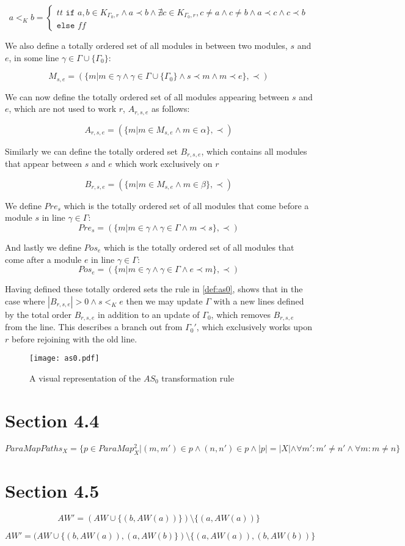\[a <_K b = \left\{\begin{matrix}
tt \texttt{ if } a,b \in K_{\Gamma_0 ,r} \land a \prec b \land \nexists c \in K_{\Gamma_0 ,r}, c \neq a \land c \neq b \land a \prec c \land c \prec b \\ \texttt{else } ff
\end{matrix}\right.\]

We also define a totally ordered set of all modules in between two modules, $s$ and $e$, in some line $\gamma \in \Gamma \cup \{\Gamma_0\} $:

\[M_{s,e} = (\{m | m \in \gamma \land \gamma \in \Gamma \cup \{\Gamma_0\} \land s \prec m \land m \prec e\}, \prec)\]

We can now define the totally ordered set of all modules appearing between $s$ and $e$, which are not used to work $r$, $A_{r,s,e}$ as follows: 

\[A_{r,s,e} = (\{m |m \in M_{s,e} \land m \in \alpha\}, \prec)\]

Similarly we can define the totally ordered set $B_{r,s,e}$, which contains all modules that appear between $s$ and $e$ which work exclusively on $r$

\[B_{r,s,e} = (\{m |m \in M_{s,e} \land m \in \beta\}, \prec)\]

We define $Pre_{s}$ which is the totally ordered set of all modules that come before a module $s$ in line $\gamma \in \Gamma$:
\[Pre_{s} = (\{m | m \in \gamma \land \gamma \in \Gamma \land m \prec s\}, \prec)\]

And lastly we define $Pos_{e}$ which is the totally ordered set of all modules that come after a module $e$  in line $\gamma \in \Gamma$:
\[Pos_{e} = (\{m | m \in \gamma \land \gamma \in \Gamma \land e \prec  m \}, \prec)\]

Having defined these totally ordered sets the rule in \cref{def:as0}, shows that in the case where $|B_{r,s,e}| > 0 \land s <_K e$ then we may update $\Gamma$ with a new lines defined by the total order $B_{r,s,e}$ in addition to an update of $\Gamma_0$, which removes $B_{r,s,e}$ from the line. This describes a branch out from $\Gamma_0'$, which exclusively works upon $r$ before rejoining with the old line. 

\begin{figure}[H]
\centering
\texttt{[image: as0.pdf]}
\caption{A visual representation of the $AS_0$ transformation rule}
\label{fig:as0}
\end{figure}

\section*{Section 4.4}
\[ParaMapPaths_{X} = \{p \in ParaMap_{X}^2 | (m,m') \in p \land (n,n') \in p \land |p| = |X| \land  \forall m': m' \neq n' \land  \forall m: m \neq n \}\]

\section*{Section 4.5}
\[AW' = (AW \cup \{(b, AW(a))\}) \setminus \{(a, AW(a))\}\]

\[AW' = (AW \cup \{(b, AW(a)), (a, AW(b)\}) \setminus \{(a, AW(a)), (b, AW(b))\}\]

